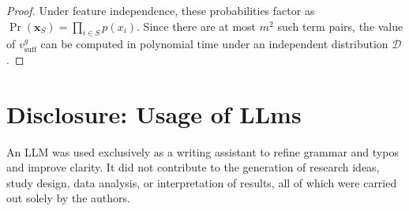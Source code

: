 \documentclass{article}
\newcommand{\x}{\textbf{x}}
\newcommand{\mbf}[1]{\ensuremath\mathbf{#1}}
\begin{document}
\begin{proof}
Under feature independence, these probabilities factor as
$\Pr(\x_{S}) = \prod_{i\in S} p(x_i)$.
Since there are at most $m^2$ such term pairs, the value of $v^{g}_{\text{suff}}$
can be computed in polynomial time under an independent distribution $\mathcal{D}$.
%
\end{proof}



\section{Disclosure: Usage of LLms}
\label{app:llm-disclosure}
An LLM was used exclusively as a writing assistant to refine grammar and typos and improve clarity. It did not contribute to the generation of research ideas, study design, data analysis, or interpretation of results, all of which were carried out solely by the authors.
\end{document}
